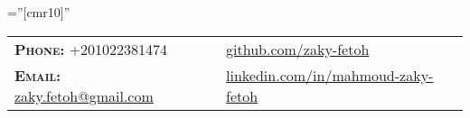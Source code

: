 \documentclass[a4paper,10pt]{article}
\begin{document}
\pagestyle{fancy}
\fancyhead{} 
\renewcommand{\headrulewidth}{0pt}

\font\fb=''[cmr10]'' 
\par{\bigskip\par} %


\begin{tabular}{lp{4cm}l}
\textbf{\textsc{Phone:}} +201022381474 && \href{https://github.com/zaky-fetoh}{github.com/zaky-fetoh} \\
\textbf{\textsc{Email:}}   \href{mailto:zaky.fetoh@gmail.com}{zaky.fetoh@gmail.com} &&\href{https://www.linkedin.com/in/mahmoud-zaky-fetoh/}{linkedin.com/in/mahmoud-zaky-fetoh}\\

\end{tabular}
\end{document}
